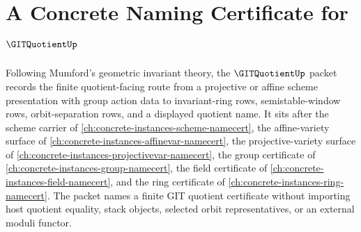 \chapter{A Concrete Naming Certificate for $\GITQuotientUp$}
\label{ch:concrete-instances-git-quotient-namecert}

Following Mumford's geometric invariant theory, the $\GITQuotientUp$ packet records the finite quotient-facing route from a projective or affine scheme presentation with group action data to invariant-ring rows, semistable-window rows, orbit-separation rows, and a displayed quotient name. It sits after the scheme carrier of \autoref{ch:concrete-instances-scheme-namecert}, the affine-variety surface of \autoref{ch:concrete-instances-affinevar-namecert}, the projective-variety surface of \autoref{ch:concrete-instances-projectivevar-namecert}, the group certificate of \autoref{ch:concrete-instances-group-namecert}, the field certificate of \autoref{ch:concrete-instances-field-namecert}, and the ring certificate of \autoref{ch:concrete-instances-ring-namecert}. The packet names a finite GIT quotient certificate without importing host quotient equality, stack objects, selected orbit representatives, or an external moduli functor.

